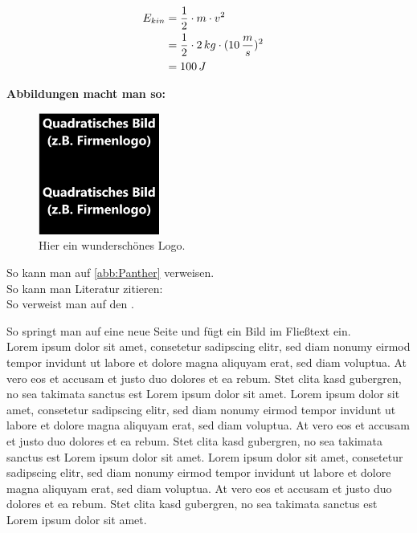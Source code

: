 \begin{equation}
    \begin{split}
        E_{kin} &= \frac{1}{2} \cdot m \cdot v^{2} \cr
        &= \frac{1}{2} \cdot 2\,kg \cdot (10\,\frac{m}{s})^{2} \cr
        &= 100\,J
    \end{split}
    \label{eq:Mehrzeilige_Gleichung}
\end{equation}


\newpage
\large{\textbf{Abbildungen macht man so:}}\\
\normalsize

\begin{figure}[H]
		\centering
        \includegraphics[width=40mm]{images/Quadrat.png}
        \caption{Hier ein wunderschönes Logo.}
        \label{abb:Panther}
\end{figure}

So kann man auf \autoref{abb:Panther} verweisen.\\

So kann man Literatur zitieren: \cite{Beispiel} \\

So verweist man auf den .


\newpage 
So springt man auf eine neue Seite und fügt ein Bild im Fließtext ein.\\

Lorem ipsum dolor sit amet, consetetur sadipscing elitr, sed diam nonumy eirmod tempor invidunt ut labore et dolore magna aliquyam erat, sed diam voluptua. At vero eos et accusam et justo duo dolores et ea rebum. Stet clita kasd gubergren, no sea takimata sanctus est Lorem ipsum dolor sit amet. Lorem ipsum dolor sit amet, consetetur sadipscing elitr, sed diam nonumy eirmod tempor invidunt ut labore et dolore magna aliquyam erat, sed diam voluptua. At vero eos et accusam et justo duo dolores et ea rebum. Stet clita kasd gubergren, no sea takimata sanctus est Lorem ipsum dolor sit amet. Lorem ipsum dolor sit amet, consetetur sadipscing elitr, sed diam nonumy eirmod tempor invidunt ut labore et dolore magna aliquyam erat, sed diam voluptua. At vero eos et accusam et justo duo dolores et ea rebum. Stet clita kasd gubergren, no sea takimata sanctus est Lorem ipsum dolor sit amet.   

